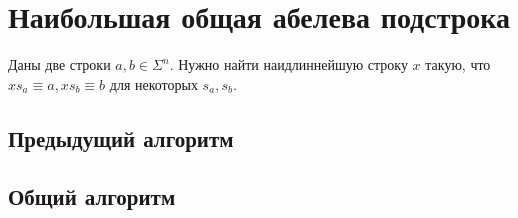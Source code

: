 \section{Наибольшая общая абелева подстрока}
Даны две строки $a, b \in \Sigma^n$. Нужно найти наидлиннейшую строку $x$ такую, что $xs_a \equiv a, xs_b \equiv b$ для некоторых $s_a, s_b$.

\subsection{Предыдущий алгоритм}

\subsection{Общий алгоритм}
